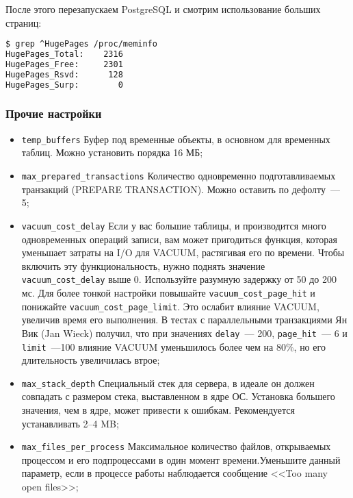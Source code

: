После этого перезапускаем PostgreSQL и смотрим использование больших страниц:

\begin{lstlisting}[language=Bash,label=lst:settings_hugepages4,caption=Проверяем использование huge pages]
$ grep ^HugePages /proc/meminfo
HugePages_Total:    2316
HugePages_Free:     2301
HugePages_Rsvd:      128
HugePages_Surp:        0
\end{lstlisting}


\subsubsection{Прочие настройки}

\begin{itemize}
  \item \lstinline!temp_buffers! Буфер под временные объекты, в основном для временных таблиц. Можно установить порядка 16 МБ;
  \item \lstinline!max_prepared_transactions! Количество одновременно подготавливаемых транзакций (PREPARE TRANSACTION). Можно оставить по дефолту~--- 5;
  \item \lstinline!vacuum_cost_delay! Если у вас большие таблицы, и производится много одновременных операций записи, вам может пригодиться функция, которая уменьшает затраты на I/O для VACUUM, растягивая его по времени. Чтобы включить эту функциональность, нужно поднять значение \lstinline!vacuum_cost_delay! выше 0. Используйте разумную задержку от 50 до 200 мс. Для более тонкой настройки повышайте \lstinline!vacuum_cost_page_hit! и понижайте \lstinline!vacuum_cost_page_limit!. Это ослабит влияние VACUUM, увеличив время его выполнения. В тестах с параллельными транзакциями Ян Вик (Jan Wieck) получил, что при значениях \lstinline!delay!~--- 200, \lstinline!page_hit!~--- 6 и \lstinline!limit!~---100 влияние VACUUM уменьшилось более чем на 80\%, но его длительность увеличилась втрое;
  \item \lstinline!max_stack_depth! Специальный стек для сервера, в идеале он должен совпадать с размером стека, выставленном в ядре ОС. Установка большего значения, чем в ядре, может привести к ошибкам. Рекомендуется устанавливать 2--4 MB;
  \item \lstinline!max_files_per_process! Максимальное количество файлов, открываемых процессом и его подпроцессами в один момент времени.Уменьшите данный параметр, если в процессе работы наблюдается сообщение <<Too many open files>>;
\end{itemize}


